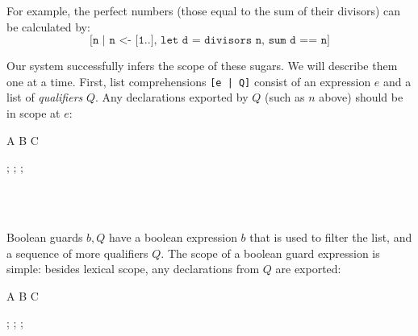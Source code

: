 For example, the perfect numbers (those equal to the sum of their
divisors) can be calculated by:
\[
\texttt{[n | n <- [1..], let d = divisors n, sum d == n]}
\]

Our system successfully infers the scope of these sugars. We will
describe them one at a time. First, list comprehensions
\texttt{[e | Q]} consist of an expression $e$ and a list of
\emph{qualifiers} $Q$. Any declarations exported by $Q$ (such as $n$
above) should be in scope at $e$:

\begin{scopeDescription}
\begin{center}
\begin{tikzScopeDiagram}
  \tikzRoot
    {A}{\tikzParentTwo{\;[e $\vert$ Q]\;}
      {B}{}
      {C}{}}

  \begin{tikzEdges}
    ;
    ;
    ;
  \end{tikzEdges}
\end{tikzScopeDiagram}
\end{center}
\begin{ScopeRules}
   \\
   \\
\end{ScopeRules}
\end{scopeDescription}

Boolean guards $b, Q$ have a boolean expression $b$ that is used to
filter the list, and a sequence of more qualifiers $Q$. The scope of a
boolean guard expression is simple: besides lexical scope, any
declarations from $Q$ are exported:

\begin{scopeDescription}
\begin{center}
\begin{tikzScopeDiagram}
  \tikzRoot
    {A}{
      {B}{}
      {C}{}}

  \begin{tikzEdges}
    ;
    ;
    ;
  \end{tikzEdges}
\end{tikzScopeDiagram}
\end{center}
\begin{ScopeRules}
   \\
   \\
\end{ScopeRules}
\end{scopeDescription}

